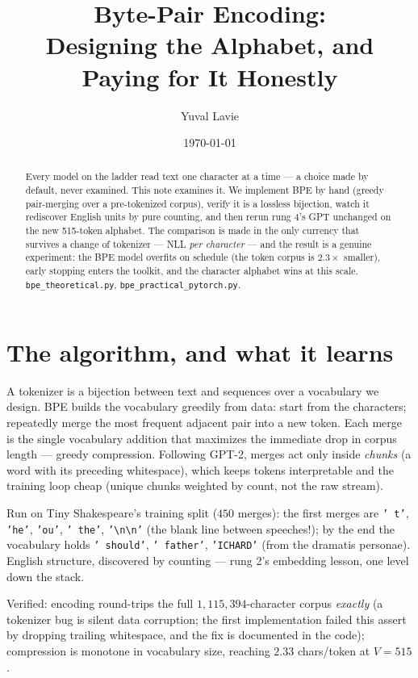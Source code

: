 \documentclass[11pt]{article}
\title{Byte-Pair Encoding:\\
Designing the Alphabet, and Paying for It Honestly}
\author{Yuval Lavie}
\date{\today}
\begin{document}
\maketitle

\begin{abstract}
Every model on the ladder read text one character at a time --- a
choice made by default, never examined. This note examines it. We
implement BPE by hand (greedy pair-merging over a pre-tokenized
corpus), verify it is a lossless bijection, watch it rediscover
English units by pure counting, and then rerun rung 4's GPT unchanged
on the new 515-token alphabet. The comparison is made in the only
currency that survives a change of tokenizer --- NLL \emph{per
character} --- and the result is a genuine experiment: the BPE model
overfits on schedule (the token corpus is $2.3\times$ smaller),
early stopping enters the toolkit, and the character alphabet wins at
this scale. \texttt{bpe\_theoretical.py},
\texttt{bpe\_practical\_pytorch.py}.
\end{abstract}

\section{The algorithm, and what it learns}

A tokenizer is a bijection between text and sequences over a
vocabulary we design. BPE builds the vocabulary greedily from data:
start from the characters; repeatedly merge the most frequent adjacent
pair into a new token. Each merge is the single vocabulary addition
that maximizes the immediate drop in corpus length --- greedy
compression. Following GPT-2, merges act only inside \emph{chunks} (a
word with its preceding whitespace), which keeps tokens interpretable
and the training loop cheap (unique chunks weighted by count, not the
raw stream).

Run on Tiny Shakespeare's training split ($450$ merges): the first
merges are \texttt{'\ t'}, \texttt{'he'}, \texttt{'ou'},
\texttt{'\ the'}, \texttt{'\textbackslash n\textbackslash n'} (the
blank line between speeches!); by the end the vocabulary holds
\texttt{'\ should'}, \texttt{'\ father'}, \texttt{'ICHARD'} (from the
dramatis personae). English structure, discovered by counting ---
rung 2's embedding lesson, one level down the stack.

Verified: encoding round-trips the full $1{,}115{,}394$-character
corpus \emph{exactly} (a tokenizer bug is silent data corruption; the
first implementation failed this assert by dropping trailing
whitespace, and the fix is documented in the code); compression is
monotone in vocabulary size, reaching $2.33$ chars/token at $V = 515$.
\end{document}

